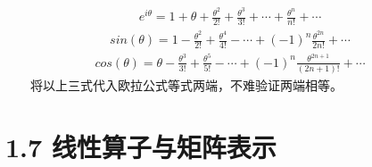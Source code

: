 \documentclass[a4paper,11pt,english]{sphinxmanual}
\begin{document}
\begin{equation*}
\begin{split}e^{i \theta} = 1 +\theta + \frac{\theta^{2}}{2!}+ \frac{\theta^{3}}{3!}+\cdots+ \frac{\theta^{n}}{n!}+\cdots\end{split}
\end{equation*}\begin{equation*}
\begin{split}sin(\theta) =  1 - \frac{\theta^{2}}{2!}+ \frac{\theta^{4}}{4!} - \cdots+ (-1)^{n}\frac{\theta^{2n}}{2n!}+\cdots\end{split}
\end{equation*}\begin{equation*}
\begin{split}cos(\theta) =  \theta - \frac{\theta^{3}}{3!}+ \frac{\theta^{5}}{5!} - \cdots+ (-1)^{n}\frac{\theta^{2n+1}}{(2n+1)!}+\cdots\end{split}
\end{equation*}
\sphinxAtStartPar
​  将以上三式代入欧拉公式等式两端，不难验证两端相等。


\section{1.7 线性算子与矩阵表示}
\label{\detokenize{rst/_u9644_u5f551_u91cf_u5b50_u8ba1_u7b97_u6570_u5b66_u57fa_u78405:id2}}
\end{document}
